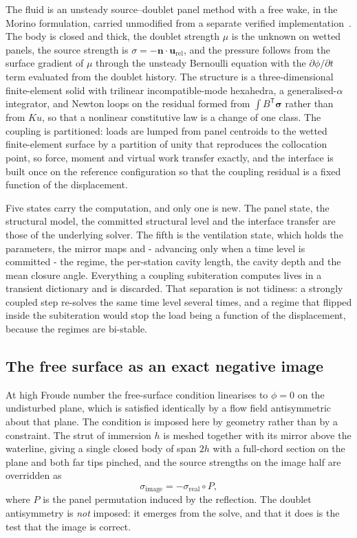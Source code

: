 \documentclass[11pt,a4paper]{article}
\begin{document}
The fluid is an unsteady source--doublet panel method with a free wake, in the
Morino formulation, carried unmodified from a separate verified
implementation~\citep{Viola2026a}. The body is closed and thick, the doublet
strength $\mu$ is the unknown on wetted panels, the source strength is
$\sigma = -\mathbf{n}\cdot\mathbf{u}_{\mathrm{rel}}$, and the pressure follows
from the surface gradient of $\mu$ through the unsteady Bernoulli equation with
the $\partial\phi/\partial t$ term evaluated from the doublet history. The
structure is a three-dimensional finite-element solid with trilinear
incompatible-mode hexahedra, a generalised-$\alpha$ integrator, and Newton loops
on the residual formed from $\int B^{\mathsf{T}}\boldsymbol{\sigma}$ rather than
from $Ku$, so that a nonlinear constitutive law is a change of one class. The
coupling is partitioned: loads are lumped from panel centroids to the wetted
finite-element surface by a partition of unity that reproduces the collocation
point, so force, moment and virtual work transfer exactly, and the interface is
built once on the reference configuration so that the coupling residual is a
fixed function of the displacement.

Five states carry the computation, and only one is new. The panel state, the
structural model, the committed structural level and the interface transfer are
those of the underlying solver. The fifth is the ventilation state, which holds
the parameters, the mirror maps and - advancing only when a time level is
committed - the regime, the per-station cavity length, the cavity depth and the
mean closure angle. Everything a coupling subiteration computes lives in a
transient dictionary and is discarded. That separation is not tidiness: a
strongly coupled step re-solves the same time level several times, and a regime
that flipped inside the subiteration would stop the load being a function of the
displacement, because the regimes are bi-stable.

\subsection{The free surface as an exact negative image}
\label{subsec:Image}

At high Froude number the free-surface condition linearises to $\phi = 0$ on the
undisturbed plane, which is satisfied identically by a flow field antisymmetric
about that plane. The condition is imposed here by geometry rather than by a
constraint. The strut of immersion $h$ is meshed together with its mirror above
the waterline, giving a single closed body of span $2h$ with a full-chord section
on the plane and both far tips pinched, and the source strengths on the image
half are overridden as
%
\begin{equation}
  \sigma_{\mathrm{image}} = -\sigma_{\mathrm{real}}\!\circ\!P ,
  \label{eq:imagesigma}
\end{equation}
%
where $P$ is the panel permutation induced by the reflection. The doublet
antisymmetry is \emph{not} imposed: it emerges from the solve, and that it does
is the test that the image is correct.
\end{document}
